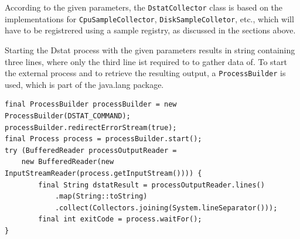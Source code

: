 According to the given parameters, the \verb|DstatCollector| class is based on the implementations for \verb|CpuSampleCollector|,
\verb|DiskSampleColletor|, etc., which will have to be registrered using a sample registry, as discussed in the sections above.

Starting the Dstat process with the given parameters results in string containing three lines, where only the third line ist required to
to gather data of. To start the external process and to retrieve the resulting output, a \verb|ProcessBuilder| is used, which is part of
the java.lang package.
\begin{lstlisting}[caption={ProcessBuilder in "DstatCollector"}, captionpos=b, label={lst:dstatprocessbuilder}]
final ProcessBuilder processBuilder = new ProcessBuilder(DSTAT_COMMAND);
processBuilder.redirectErrorStream(true);
final Process process = processBuilder.start();
try (BufferedReader processOutputReader =
    new BufferedReader(new InputStreamReader(process.getInputStream()))) {
        final String dstatResult = processOutputReader.lines()
            .map(String::toString)
            .collect(Collectors.joining(System.lineSeparator()));
        final int exitCode = process.waitFor();
}
\end{lstlisting}

